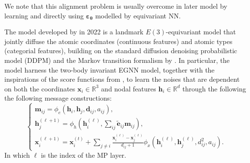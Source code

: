We note that this alignment problem is usually overcome in later model by learning and directly using $\boldsymbol{\varepsilon}_{\boldsymbol{\theta}}$ modelled by equivariant NN.

The model developed by \citet{hoogeboom2022equivariant} in 2022 is a landmark $E(3)$-equivariant model that jointly diffuse the atomic coordinates (continuous features) and atomic types (categorial features), building on the standard diffusion denoising probabilistic model (DDPM)\cite{ho2020denoising} and the Markov transition formalism by \citet{xu2022geodiff}. In particular, the model harness the two-body invariant EGNN model\cite{satorras2021n}, together with the inspirations of the score functions from \citet{shi2021learning}, to learn the noises that are dependent on both the coordinates $\bm{x}_i\in\mathbb{R}^3$ and nodal features $\bm{h}_i\in\mathbb{R}^d$ through the following the following message constructions:
\begin{equation}\label{eq:Hoogeboom_MP}
    \begin{cases}
        \bm{m}_{ij}=\phi_{e}\left(\bm{h}_i,\bm{h}_j,\bm{d}_{ij},a_{ij}\right),\\
        \bm{h}_{j}^{(\ell+1)}=\phi_{h}\left( \bm{h}_i^{(\ell)},\sum_{ij}\tilde{\bm{e}}_{ij}\bm{m}_{ij}\right),\\
        \displaystyle{\bm{x}_i^{(\ell+1)}=\bm{x}_i^{(t)}+\sum_{j\neq i}\frac{\bm{x}_i^{(\ell)}-\bm{x}_j^{(\ell)}}{d_{ij}+1}\phi_{x}\left(\bm{h}_i^{(\ell)},\bm{h}_j^{(\ell)},d^2_{ij},a_{ij}\right)}.
    \end{cases}
\end{equation}
In which $\ell$ is the index of the MP layer.
